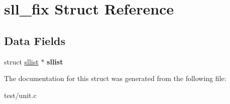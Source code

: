 \hypertarget{structsll__fix}{\section{sll\-\_\-fix Struct Reference}
\label{structsll__fix}
}
\subsection*{Data Fields}
\begin{DoxyCompactItemize}
\item 
\hypertarget{structsll__fix_af123a35bca5d1319b0f541f2ae667c56}{struct \hyperlink{structsllist}{sllist} $\ast$ {\bfseries sllist}}\label{structsll__fix_af123a35bca5d1319b0f541f2ae667c56}

\end{DoxyCompactItemize}


The documentation for this struct was generated from the following file\-:\begin{DoxyCompactItemize}
\item 
test/unit.\-c\end{DoxyCompactItemize}
